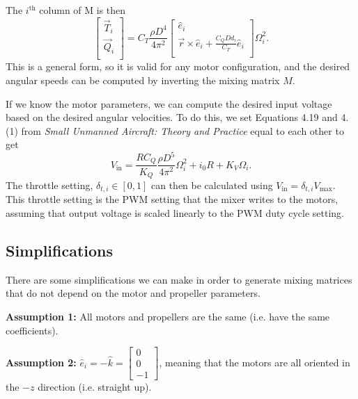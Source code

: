 \documentclass{article}
\begin{document}
The $i^{\text{th}}$ column of M is then
\[
\begin{bmatrix}
\Vec{T}_i \\ \Vec{Q}_i \\
\end{bmatrix}
=
C_T \frac{\rho D^4}{4 \pi^2}
\begin{bmatrix}
    \hat{e}_i \\
    \vec{r} \times \hat{e}_i  + \frac{C_Q D d_i}{C_T} \hat{e}_i \\
\end{bmatrix}
\Omega_i^2.
\]
This is a general form, so it is valid for any motor configuration, and the desired angular speeds can be computed by inverting the mixing matrix $M$.

If we know the motor parameters, we can compute the desired input voltage based on the desired angular velocities.
To do this, we set Equations 4.19 and 4.(1) from \textit{Small Unmanned Aircraft: Theory and Practice} equal to each other to get
\[
V_{\text{in}} = \frac{R C_Q}{K_Q} \frac{\rho D^5 }{4 \pi^2} \Omega_i^2 + i_0 R + K_V \Omega_i. 
\]
The throttle setting, $\delta_{t,i} \in [0,1]$ can then be calculated using $V_{\text{in}} = \delta_{t,i} V_{\text{max}}$.
This throttle setting is the PWM setting that the mixer writes to the motors, assuming that output voltage is scaled linearly to the PWM duty cycle setting.

\subsection{Simplifications}
There are some simplifications we can make in order to generate mixing matrices that do not depend on the motor and propeller parameters.

\noindent
\textbf{Assumption 1:} All motors and propellers are the same (i.e. have the same coefficients).

\noindent
\textbf{Assumption 2:} $\hat{e}_i = -\hat{k} = \begin{bmatrix}
    0 \\ 0 \\ -1
\end{bmatrix}$,
meaning that the motors are all oriented in the $-z$ direction (i.e. straight up).
\end{document}
